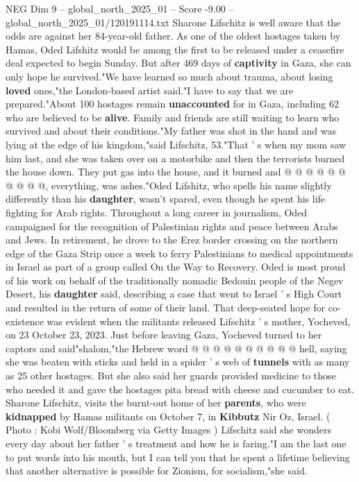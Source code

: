 \begin{textsample}{NEG Dim 9 – global\_north\_2025\_01 – Score -9.00 – global\_north\_2025\_01/120191114.txt}  \label{ex:f9_neg_028}
Sharone Lifschitz is well aware that the odds are against her 84-year-old father.
As one of the oldest hostages taken by Hamas, Oded Lifshitz would be among the first to be released under a ceasefire deal expected to begin Sunday.
But after 469 days of \textbf{captivity} in Gaza, she can only hope he survived."We have learned so much about trauma, about losing \textbf{loved} ones,"the London-based artist said."I have to say that we are prepared."About 100 hostages remain \textbf{unaccounted} for in Gaza, including 62 who are believed to be \textbf{alive}.
Family and friends are still waiting to learn who survived and about their conditions."My father was shot in the hand and was lying at the edge of his kingdom,"said Lifschitz, 53."That ' s when my mom saw him last, and she was taken over on a motorbike and then the terrorists burned the house down.
They put gas into the house, and it burned and @ @ @ @ @ @ @ @ @ @, everything, was ashes."Oded Lifshitz, who spells his name slightly differently than his \textbf{daughter}, wasn't spared, even though he spent his life fighting for Arab rights.
Throughout a long career in journalism, Oded campaigned for the recognition of Palestinian rights and peace between Arabs and Jews.
In retirement, he drove to the Erez border crossing on the northern edge of the Gaza Strip once a week to ferry Palestinians to medical appointments in Israel as part of a group called On the Way to Recovery.
Oded is most proud of his work on behalf of the traditionally nomadic Bedouin people of the Negev Desert, his \textbf{daughter} said, describing a case that went to Israel ' s High Court and resulted in the return of some of their land.
That deep-seated hope for co-existence was evident when the militants released Lifschitz ' s mother, Yocheved, on 23 October 23, 2023.
Just before leaving Gaza, Yocheved turned to her captors and said"shalom,"the Hebrew word @ @ @ @ @ @ @ @ @ @ hell, saying she was beaten with sticks and held in a spider ' s web of \textbf{tunnels} with as many as 25 other hostages.
But she also said her guards provided medicine to those who needed it and gave the hostages pita bread with cheese and cucumber to eat.
Sharone Lifschitz, visits the burnt-out home of her \textbf{parents}, who were \textbf{kidnapped} by Hamas militants on October 7, in \textbf{Kibbutz} Nir Oz, Israel. ( Photo : Kobi Wolf/Bloomberg via Getty Images ) Lifschitz said she wonders every day about her father ' s treatment and how he is faring."I am the last one to put words into his mouth, but I can tell you that he spent a lifetime believing that another alternative is possible for Zionism, for socialism,"she said.

\end{textsample}
